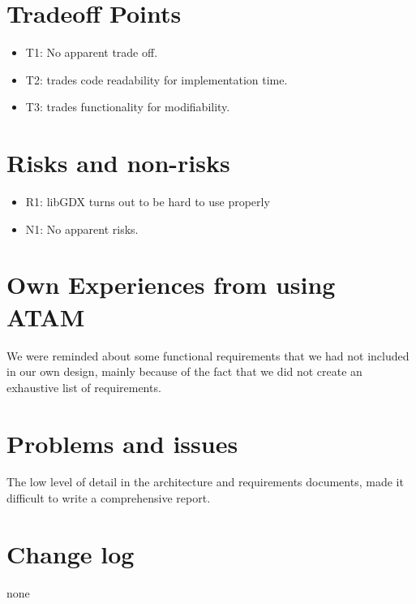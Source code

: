\documentclass[12pt, a4paper]{article}
\begin{document}
\section{Tradeoff Points}
\begin{itemize}
    \item T1: No apparent trade off. 
    \item T2: trades code readability for implementation time. 
    \item T3: trades functionality for modifiability. 
\end{itemize}

\section{Risks and non-risks}
\begin{itemize}
    \item R1: libGDX turns out to be hard to use properly
    \item N1: No apparent risks. 
\end{itemize}

\section{Own Experiences from using ATAM}
We were reminded about some functional requirements that we had not included in
our own design, mainly because of the fact that we did not create an exhaustive
list of requirements. 

\section{Problems and issues}
The low level of detail in the architecture and requirements documents, made it
difficult to write a comprehensive report. 

\section{Change log}
none
\end{document}
